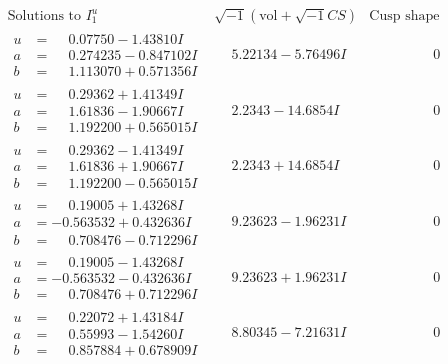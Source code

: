 \documentclass[1p]{elsarticle_modified}
\theoremstyle{definition}
\newcommand{\I}{\sqrt{-1}}
\begin{document}
$$\begin{array}{c|c|c}
\text{Solutions to }I^u_{1}& \I (\text{vol} + \sqrt{-1}CS) & \text{Cusp shape}\\
 \hline 
\begin{aligned}
u &= \phantom{-}0.07750 - 1.43810 I \\
a &= \phantom{-}0.274235 - 0.847102 I \\
b &= \phantom{-}1.113070 + 0.571356 I\end{aligned}
 & \phantom{-}5.22134 - 5.76496 I & \phantom{-0.000000 } 0 \\ \hline\begin{aligned}
u &= \phantom{-}0.29362 + 1.41349 I \\
a &= \phantom{-}1.61836 - 1.90667 I \\
b &= \phantom{-}1.192200 + 0.565015 I\end{aligned}
 & \phantom{-}2.2343 - 14.6854 I & \phantom{-0.000000 } 0 \\ \hline\begin{aligned}
u &= \phantom{-}0.29362 - 1.41349 I \\
a &= \phantom{-}1.61836 + 1.90667 I \\
b &= \phantom{-}1.192200 - 0.565015 I\end{aligned}
 & \phantom{-}2.2343 + 14.6854 I & \phantom{-0.000000 } 0 \\ \hline\begin{aligned}
u &= \phantom{-}0.19005 + 1.43268 I \\
a &= -0.563532 + 0.432636 I \\
b &= \phantom{-}0.708476 - 0.712296 I\end{aligned}
 & \phantom{-}9.23623 - 1.96231 I & \phantom{-0.000000 } 0 \\ \hline\begin{aligned}
u &= \phantom{-}0.19005 - 1.43268 I \\
a &= -0.563532 - 0.432636 I \\
b &= \phantom{-}0.708476 + 0.712296 I\end{aligned}
 & \phantom{-}9.23623 + 1.96231 I & \phantom{-0.000000 } 0 \\ \hline\begin{aligned}
u &= \phantom{-}0.22072 + 1.43184 I \\
a &= \phantom{-}0.55993 - 1.54260 I \\
b &= \phantom{-}0.857884 + 0.678909 I\end{aligned}
 & \phantom{-}8.80345 - 7.21631 I & \phantom{-0.000000 } 0 \\ \hline\begin{aligned}

\end{aligned}
\end{array}$$
\end{document}
